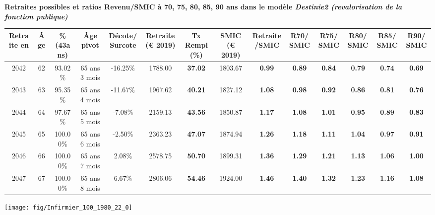  \vspace{0.1cm} 
{\bf \noindent Retraites possibles et ratios Revenu/SMIC à 70, 75, 80, 85, 90 ans dans le modèle \emph{Destinie2 (revalorisation de la fonction publique)}}  
 
\begin{adjustbox}{max width=\textwidth} 
\begin{tabular}[htb]{|c|c||c|c|c||c|c||c|c||c|c|c|c|c|} 
\hline 
 Retraite en &  Âge &  \%(43ans) &  Âge pivot &  Décote/Surcote &  Retraite (\euro{} 2019) &  Tx Rempl(\%) &  SMIC (\euro{} 2019) &  Retraite/SMIC &  R70/SMIC &  R75/SMIC &  R80/SMIC &  R85/SMIC &  R90/SMIC \\ 
\hline \hline 
 2042 &  62 &  93.02\% &  65 ans 3 mois &  -16.25\% &  1788.00 &  {\bf 37.02} &  1803.67 &  {\bf {\color{red} 0.99}} &  {\bf {\color{red} 0.89}} &  {\bf {\color{red} 0.84}} &  {\bf {\color{red} 0.79}} &  {\bf {\color{red} 0.74}} &  {\bf {\color{red} 0.69}} \\ 
\hline 
 2043 &  63 &  95.35\% &  65 ans 4 mois &  -11.67\% &  1967.62 &  {\bf 40.21} &  1827.12 &  {\bf 1.08} &  {\bf {\color{red} 0.98}} &  {\bf {\color{red} 0.92}} &  {\bf {\color{red} 0.86}} &  {\bf {\color{red} 0.81}} &  {\bf {\color{red} 0.76}} \\ 
\hline 
 2044 &  64 &  97.67\% &  65 ans 5 mois &  -7.08\% &  2159.13 &  {\bf 43.56} &  1850.87 &  {\bf 1.17} &  {\bf 1.08} &  {\bf 1.01} &  {\bf {\color{red} 0.95}} &  {\bf {\color{red} 0.89}} &  {\bf {\color{red} 0.83}} \\ 
\hline 
 2045 &  65 &  100.00\% &  65 ans 6 mois &  -2.50\% &  2363.23 &  {\bf 47.07} &  1874.94 &  {\bf 1.26} &  {\bf 1.18} &  {\bf 1.11} &  {\bf 1.04} &  {\bf {\color{red} 0.97}} &  {\bf {\color{red} 0.91}} \\ 
\hline 
 2046 &  66 &  100.00\% &  65 ans 7 mois &  2.08\% &  2578.75 &  {\bf 50.70} &  1899.31 &  {\bf 1.36} &  {\bf 1.29} &  {\bf 1.21} &  {\bf 1.13} &  {\bf 1.06} &  {\bf {\color{red} 1.00}} \\ 
\hline 
 2047 &  67 &  100.00\% &  65 ans 8 mois &  6.67\% &  2806.06 &  {\bf 54.46} &  1924.00 &  {\bf 1.46} &  {\bf 1.40} &  {\bf 1.32} &  {\bf 1.23} &  {\bf 1.16} &  {\bf 1.08} \\ 
\hline 
\hline 
\end{tabular} 
\end{adjustbox} 
 
 \vspace{0.1cm} 

 {\hspace{-2.2cm}\texttt{[image: fig/Infirmier\_100\_1980\_22\_0]}} 

